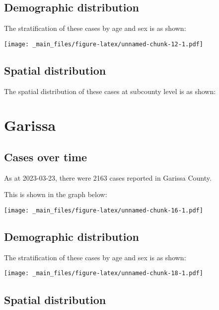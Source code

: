 \documentclass[
]{book}
\begin{document}
\hypertarget{demographic-distribution-1}{%
\section{Demographic distribution}\label{demographic-distribution-1}}

The stratification of these cases by age and sex is as shown:

\texttt{[image: \_main\_files/figure-latex/unnamed-chunk-12-1.pdf]}

\hypertarget{spatial-distribution-1}{%
\section{Spatial distribution}\label{spatial-distribution-1}}

The spatial distribution of these cases at subcounty level is as shown:

\hypertarget{garissa}{%
\chapter{Garissa}\label{garissa}}

\hypertarget{cases-over-time-2}{%
\section{Cases over time}\label{cases-over-time-2}}

As at 2023-03-23, there were 2163 cases reported in Garissa County.

This is shown in the graph below:

\texttt{[image: \_main\_files/figure-latex/unnamed-chunk-16-1.pdf]}

\hypertarget{demographic-distribution-2}{%
\section{Demographic distribution}\label{demographic-distribution-2}}

The stratification of these cases by age and sex is as shown:

\texttt{[image: \_main\_files/figure-latex/unnamed-chunk-18-1.pdf]}

\hypertarget{spatial-distribution-2}{%
\section{Spatial distribution}\label{spatial-distribution-2}}
\end{document}
